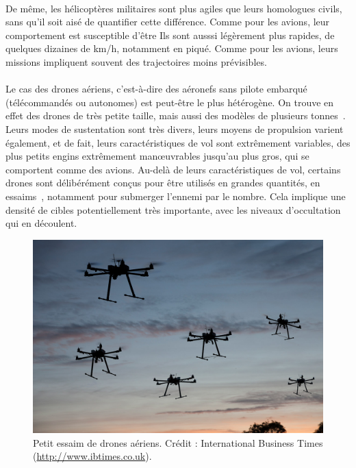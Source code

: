 	\paragraph{}
	De même, les hélicoptères militaires sont plus agiles que leurs homologues civils, sans qu'il soit aisé de quantifier cette différence. Comme pour les avions, leur comportement est susceptible d'être  Ils sont ausssi légèrement plus rapides, de quelques dizaines de km/h, notamment en piqué. Comme pour les avions, leurs missions impliquent souvent des trajectoires moins prévisibles.
	
	\paragraph{}
	Le cas des drones aériens, c'est-à-dire des aéronefs sans pilote embarqué (télécommandés ou autonomes) est peut-être le plus hétérogène. On trouve en effet des drones de très petite taille, mais aussi des modèles de plusieurs tonnes~\cite{reaper}. Leurs modes de sustentation sont très divers, leurs moyens de propulsion varient également, et de fait, leurs caractéristiques de vol sont extrêmement variables, des plus petits engins extrêmement manœuvrables jusqu'au plus gros, qui se comportent comme des avions. Au-delà de leurs caractéristiques de vol, certains drones sont délibérément conçus pour être utilisés en grandes quantités, en essaims~\cite{locust, alonso2016distributed, saska2014autonomous}, notamment pour submerger l'ennemi par le nombre. Cela implique une densité de cibles potentiellement très importante, avec les niveaux d'occultation qui en découlent.
	
	\begin{figure}[ht]
		\centering
		\includegraphics[width=\textwidth]{figures/swarm}
		\caption{Petit essaim de drones aériens. Crédit : International Business Times (\url{http://www.ibtimes.co.uk}).}
		\label{fig:swarm}
	\end{figure}
	
